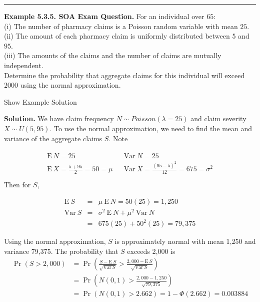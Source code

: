 \documentclass[]{book}
\theoremstyle{definition}
\theoremstyle{definition}
\theoremstyle{definition}
\theoremstyle{remark}
\begin{document}
\begin{center}\rule{0.5\linewidth}{\linethickness}\end{center}

\textbf{Example 5.3.5. SOA Exam Question.} For an individual over
\(65\):\\
(i) The number of pharmacy claims is a Poisson random variable with mean
\(25\).\\
(ii) The amount of each pharmacy claim is uniformly distributed between
\(5\) and \(95\).\\
(iii) The amounts of the claims and the number of claims are mutually
independent.\\
Determine the probability that aggregate claims for this individual will
exceed \(2000\) using the normal approximation.

Show Example Solution

\hypertarget{toggleExampleAggLoss.3.5}{}
\textbf{Solution.} We have claim frequency
\(N \sim Poisson (\lambda = 25)\) and claim severity
\(X \sim U \left(5, 95 \right)\). To use the normal approximation, we
need to find the mean and variance of the aggregate claims \(S\). Note

\[\begin{matrix}
\begin{array}{lll}
\mathrm{E~} N = 25 & & \mathrm{Var~} N = 25\\
\mathrm{E~}X = \frac{5+95}{2} = 50 = \mu & & \mathrm{Var~}X = \frac{(95-5)^2}{12} = 675 = \sigma^2\\
\end{array}
\end{matrix}\] Then for \(S\),

\begin{eqnarray*}
\mathrm{E~}S &=& \mu \ \mathrm{E~} N = 50(25) = 1,250\\
\mathrm{Var~}S &=& \sigma^2 \ \mathrm{E~}N + \mu^2 \ \mathrm{Var~}N\\
&=& 675 (25) + 50^2 (25) = 79,375
\end{eqnarray*}

Using the normal approximation, \(S\) is approximately normal with mean
1,250 and variance 79,375. The probability that \(S\) exceeds 2,000 is
\[\begin{aligned}
\Pr(S>2,000) &= \Pr \left(\frac{S - \mathrm{E~} S}{\sqrt{\mathrm{Var~} S}} > \frac{2,000- \mathrm{E~} S}{\sqrt{\mathrm{Var~} S}} \right) \\
&= \Pr\left( N(0,1) > \frac{2,000-1,250}{\sqrt{79,375}} \right) \\
&= \Pr (N(0,1) > 2.662) = 1-\Phi(2.662) = 0.003884
\end{aligned}\]
\end{document}
